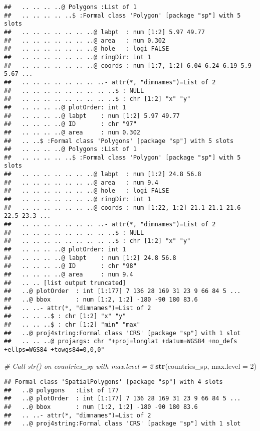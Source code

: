 \documentclass[]{article}
\newenvironment{Shaded}{\begin{snugshade}}{\end{snugshade}}
\newcommand{\CommentTok}[1]{\textcolor[rgb]{0.56,0.35,0.01}{\textit{#1}}}
\newcommand{\DataTypeTok}[1]{\textcolor[rgb]{0.13,0.29,0.53}{#1}}
\newcommand{\DecValTok}[1]{\textcolor[rgb]{0.00,0.00,0.81}{#1}}
\newcommand{\KeywordTok}[1]{\textcolor[rgb]{0.13,0.29,0.53}{\textbf{#1}}}
\newcommand{\NormalTok}[1]{#1}
\begin{document}
\begin{verbatim}
##   .. .. .. ..@ Polygons :List of 1
##   .. .. .. .. ..$ :Formal class 'Polygon' [package "sp"] with 5 slots
##   .. .. .. .. .. .. ..@ labpt  : num [1:2] 5.97 49.77
##   .. .. .. .. .. .. ..@ area   : num 0.302
##   .. .. .. .. .. .. ..@ hole   : logi FALSE
##   .. .. .. .. .. .. ..@ ringDir: int 1
##   .. .. .. .. .. .. ..@ coords : num [1:7, 1:2] 6.04 6.24 6.19 5.9 5.67 ...
##   .. .. .. .. .. .. .. ..- attr(*, "dimnames")=List of 2
##   .. .. .. .. .. .. .. .. ..$ : NULL
##   .. .. .. .. .. .. .. .. ..$ : chr [1:2] "x" "y"
##   .. .. .. ..@ plotOrder: int 1
##   .. .. .. ..@ labpt    : num [1:2] 5.97 49.77
##   .. .. .. ..@ ID       : chr "97"
##   .. .. .. ..@ area     : num 0.302
##   .. ..$ :Formal class 'Polygons' [package "sp"] with 5 slots
##   .. .. .. ..@ Polygons :List of 1
##   .. .. .. .. ..$ :Formal class 'Polygon' [package "sp"] with 5 slots
##   .. .. .. .. .. .. ..@ labpt  : num [1:2] 24.8 56.8
##   .. .. .. .. .. .. ..@ area   : num 9.4
##   .. .. .. .. .. .. ..@ hole   : logi FALSE
##   .. .. .. .. .. .. ..@ ringDir: int 1
##   .. .. .. .. .. .. ..@ coords : num [1:22, 1:2] 21.1 21.1 21.6 22.5 23.3 ...
##   .. .. .. .. .. .. .. ..- attr(*, "dimnames")=List of 2
##   .. .. .. .. .. .. .. .. ..$ : NULL
##   .. .. .. .. .. .. .. .. ..$ : chr [1:2] "x" "y"
##   .. .. .. ..@ plotOrder: int 1
##   .. .. .. ..@ labpt    : num [1:2] 24.8 56.8
##   .. .. .. ..@ ID       : chr "98"
##   .. .. .. ..@ area     : num 9.4
##   .. .. [list output truncated]
##   ..@ plotOrder  : int [1:177] 7 136 28 169 31 23 9 66 84 5 ...
##   ..@ bbox       : num [1:2, 1:2] -180 -90 180 83.6
##   .. ..- attr(*, "dimnames")=List of 2
##   .. .. ..$ : chr [1:2] "x" "y"
##   .. .. ..$ : chr [1:2] "min" "max"
##   ..@ proj4string:Formal class 'CRS' [package "sp"] with 1 slot
##   .. .. ..@ projargs: chr "+proj=longlat +datum=WGS84 +no_defs +ellps=WGS84 +towgs84=0,0,0"
\end{verbatim}

\begin{Shaded}
\begin{Highlighting}[]
\CommentTok{# Call str() on countries_sp with max.level = 2}
\KeywordTok{str}\NormalTok{(countries_sp, }\DataTypeTok{max.level =} \DecValTok{2}\NormalTok{)}
\end{Highlighting}
\end{Shaded}

\begin{verbatim}
## Formal class 'SpatialPolygons' [package "sp"] with 4 slots
##   ..@ polygons   :List of 177
##   ..@ plotOrder  : int [1:177] 7 136 28 169 31 23 9 66 84 5 ...
##   ..@ bbox       : num [1:2, 1:2] -180 -90 180 83.6
##   .. ..- attr(*, "dimnames")=List of 2
##   ..@ proj4string:Formal class 'CRS' [package "sp"] with 1 slot
\end{verbatim}
\end{document}
